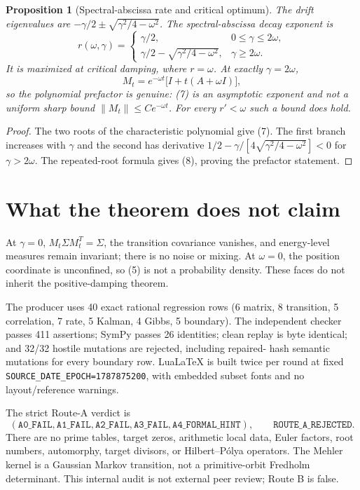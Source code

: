 \documentclass[10pt]{article}
\newtheorem{proposition}{Proposition}
\begin{document}
\begin{proposition}[Spectral-abscissa rate and critical optimum]\label{prop:rate}
The drift eigenvalues are
$-\gamma/2\pm\sqrt{\gamma^2/4-\omega^2}$.  The spectral-abscissa decay
exponent is
\begin{equation}
r(\omega,\gamma)=
\begin{cases}
\gamma/2,&0\leq\gamma\leq2\omega,\\
\gamma/2-\sqrt{\gamma^2/4-\omega^2},&\gamma\geq2\omega.
\end{cases} \tag{7}
\end{equation}
It is maximized at critical damping, where $r=\omega$.  At exactly
$\gamma=2\omega$,
\begin{equation}
M_t=e^{-\omega t}\bigl[I+t(A+\omega I)\bigr], \tag{8}
\end{equation}
so the polynomial prefactor is genuine: (7) is an asymptotic exponent and
not a uniform sharp bound $\|M_t\|\leq Ce^{-\omega t}$.  For every
$r'<\omega$ such a bound does hold.
\end{proposition}
\begin{proof}
The two roots of the characteristic polynomial give (7).  The first branch
increases with $\gamma$ and the second has derivative
$1/2-\gamma/[4\sqrt{\gamma^2/4-\omega^2}]<0$ for $\gamma>2\omega$.
The repeated-root formula gives (8), proving the prefactor statement.
\end{proof}

\section{What the theorem does not claim}
At $\gamma=0$, $M_t\Sigma M_t^T=\Sigma$, the transition covariance vanishes,
and energy-level measures remain invariant; there is no noise or mixing.  At
$\omega=0$, the position coordinate is unconfined, so (5) is not a
probability density.  These faces do not inherit the positive-damping
theorem.

The producer uses 40 exact rational regression rows (6 matrix, 8 transition,
5 correlation, 7 rate, 5 Kalman, 4 Gibbs, 5 boundary).  The independent
checker passes 411 assertions; SymPy passes 26 identities; clean replay is
byte identical; and 32/32 hostile mutations are rejected, including repaired-
hash semantic mutations for every boundary row.  LuaLaTeX is built
twice per round at fixed \texttt{SOURCE\_DATE\_EPOCH=1787875200}, with embedded subset
fonts and no layout/reference warnings.

The strict Route-A verdict is
\[
(\mathtt{A0\_FAIL},\mathtt{A1\_FAIL},\mathtt{A2\_FAIL},
\mathtt{A3\_FAIL},\mathtt{A4\_FORMAL\_HINT}),
\qquad \mathtt{ROUTE\_A\_REJECTED}.
\]
There are no prime tables, target zeros, arithmetic local data, Euler factors,
root numbers, automorphy, target divisors, or Hilbert--P\'olya operators.
The Mehler kernel is a Gaussian Markov transition, not a primitive-orbit
Fredholm determinant.  This internal audit is not external peer review;
Route B is false.
\end{document}
